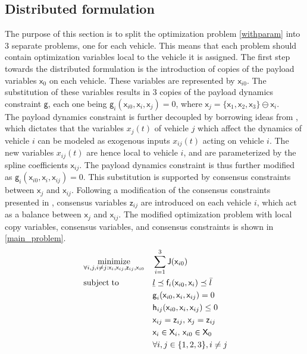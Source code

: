 \documentclass[letterpaper, 10 pt, conference]{ieeeconf}
\newcommand{\ubar}[1]{\text{\b{$#1$}}}
\DeclareMathOperator*{\minimize}{minimize}
\DeclareMathOperator*{\subj}{subject\;to}
\newcommand{\cx}{\textsf{x}}
\newcommand{\cz}{\textsf{z}}
\newcommand{\J}{\textsf{J}}
\newcommand{\cf}{\textsf{f}}
\newcommand{\cg}{\textsf{g}}
\newcommand{\ch}{\textsf{h}}
\newcommand{\X}{\textsf{X}}
\begin{document}
 \subsection{Distributed formulation}
 The purpose of this section is to split the optimization problem \eqref{withparam} into 3 separate problems, one for each vehicle. This means that each problem should contain optimization variables local to the vehicle it is assigned. The first step towards the distributed formulation is the introduction of copies of the payload variables $\cx_0$ on each vehicle. These variables are represented by $\cx_{i0}$. The substitution of these variables results in 3 copies of the payload dynamics constraint $\cg$, each one being $\cg_i(\cx_{i0},\cx_i,\cx_j) = 0$, where $\cx_j = \{\cx_1,\cx_2,\cx_3\}\ominus \cx_i$.
 \\ \indent
 The payload dynamics constraint is further decoupled by borrowing ideas from \cite{c11}, which dictates that the variables $x_{j}(t)$ of vehicle $j$ which affect the dynamics of vehicle $i$ can be modeled as exogenous inputs $x_{ij}(t)$ acting on vehicle $i$. The new variables $x_{ij}(t)$ are hence local to vehicle $i$, and are parameterized by the spline coefficients $\cx_{ij}$. The payload dynamics constraint is thus further modified as $\cg_i(\cx_{i0},\cx_i,\cx_{ij}) = 0$. This substitution is supported by consensus constraints between  $\cx_{j}$ and $\cx_{ij}$. Following a modification of the consensus constraints presented in \cite{c9}, consensus variables $\cz_{ij}$ are introduced on each vehicle $i$, which act as a balance between $\cx_{j}$ and $\cx_{ij}$. The modified optimization problem with local copy variables, consensus variables, and consensus constraints is shown in \eqref{main_problem}.
   \begin{equation}
     \label{main_problem}
     \begin{aligned}
       & \minimize_{\forall i,j,i \neq j:\cx_i,\cx_{ij},\cz_{ij},\cx_{i0}} &&  \sum\limits_{i=1}^{3}\J(\cx_{i0}) \\
       & \subj
       && \ubar{l} \preceq \cf_i(\cx_{i0},\cx_i) \preceq \bar{l}\\
       &       && \cg_i(\cx_{i0},\cx_i,\cx_{ij}) = 0 \\
       &        && \ch_{ij}(\cx_{i0},\cx_i,\cx_{ij}) \leq 0 \\
       &         && \cx_{ij} = \cz_{ij},\, \cx_{j} = \cz_{ij} \\
       &        && \cx_i \in \X_i,\, \cx_{i0} \in \X_0 \\
       &                                && \forall i,j \in \{1,2,3\}, i \neq j
     \end{aligned}
   \end{equation}
\end{document}
